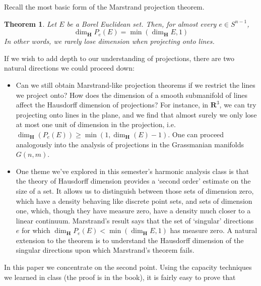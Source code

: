 \documentclass{article}
\theoremstyle{plain}
\newtheorem{theorem}{Theorem}
\theoremstyle{remark}
\theoremstyle{definition}
\begin{document}
\begin{comment}
	If $\alpha > 1$, then $I_1(\mu_e) < \infty$ for almost all $e \in S^{n-1}$, hence
	\[ \int_{-\infty}^\infty |\widehat{\mu}(x)|^2\; dx < \infty  \]
	But this implies $\mu_e \in L^2(\mathbf{R})$, hence $\mu_e$ is absolutely continuous with respect to the Lebesgue measure. But then
	\[ 0 < \mu(E) = \mu_e(P_e(E)) = \int_{-\infty}^\infty \frac{d\mu_e}{dx}\; dx \]
	and this implies $|P_e(E)| > 0$.
\end{proof}	

\end{comment}

\maketitle

Recall the most basic form of the Marstrand projection theorem.

\begin{theorem}
	Let $E$ be a Borel Euclidean set. Then, for almost every $e \in S^{n-1}$,
	\[ \dim_{\mathbf{H}} P_e(E) = \min(\dim_{\mathbf{H}} E, 1) \]
	In other words, we rarely lose dimension when projecting onto lines.
\end{theorem}

If we wish to add depth to our understanding of projections, there are two natural directions we could proceed down:
%
\begin{itemize}
	\item Can we still obtain Marstrand-like projection theorems if we restrict the lines we project onto? How does the dimension of a smooth submanifold of lines affect the Hausdorff dimension of projections? For instance, in $\mathbf{R}^3$, we can try projecting onto lines in the plane, and we find that almost surely we only lose at most one unit of dimension in the projection, i.e. $\dim_{\mathbf{H}}(P_e(E)) \geq \min(1, \dim_{\mathbf{H}}(E) - 1)$. One can proceed analogously into the analysis of projections in the Grassmanian manifolds $G(n,m)$.

	\item One theme we've explored in this semester's harmonic analysis class is that the theory of Hausdorff dimension provides a `second order' estimate on the size of a set. It allows us to distinguish between those sets of dimension zero, which have a density behaving like discrete point sets, and sets of dimension one, which, though they have measure zero, have a density much closer to a linear continuum. Marstrand's result says that the set of `singular' directions $e$ for which $\dim_{\mathbf{H}} P_e(E) < \min(\dim_{\mathbf{H}} E, 1)$ has measure zero. A natural extension to the theorem is to understand the Hausdorff dimension of the singular directions upon which Marstrand's theorem fails.
\end{itemize}
%
In this paper we concentrate on the second point. Using the capacity techniques we learned in class (the proof is in the book), it is fairly easy to prove that
\end{document}
